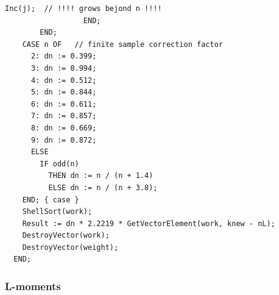 \begin{refsection}
\begin{lstlisting}[caption=Qn: doesn't give same result as naive Qn]
                    Inc(j);  // !!!! grows bejond n !!!!
                  END;
        END;
    CASE n OF   // finite sample correction factor
      2: dn := 0.399;
      3: dn := 0.994;
      4: dn := 0.512;
      5: dn := 0.844;
      6: dn := 0.611;
      7: dn := 0.857;
      8: dn := 0.669;
      9: dn := 0.872;
      ELSE
        IF odd(n)
          THEN dn := n / (n + 1.4)
          ELSE dn := n / (n + 3.8);
    END; { case }
    ShellSort(work);
    Result := dn * 2.2219 * GetVectorElement(work, knew - nL);
    DestroyVector(work);
    DestroyVector(weight);
  END;
\end{lstlisting}

\subsubsection{L-moments}


\end{refsection}
